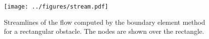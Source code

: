 \documentclass[11pt]{article}
\begin{document}
\begin{figure}[h]
  \centering
      \texttt{[image: ../figures/stream.pdf]}
  \caption{Streamlines of the flow computed by the boundary element method for a rectangular obstacle. The nodes are shown over the rectangle.}
  \label{fig:stream}
\end{figure}
  
\clearpage



 
\end{document}
